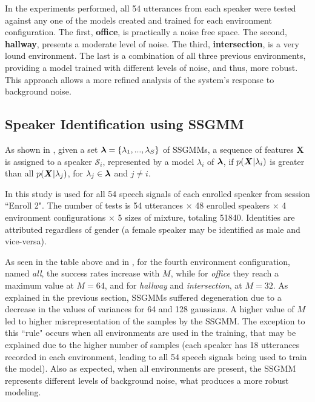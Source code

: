 In the experiments performed, all 54 utterances from each speaker were tested against any one of the models created and trained for each environment configuration. The first, \textbf{office}, is practically a noise free space. The second, \textbf{hallway}, presents a moderate level of noise. The third, \textbf{intersection}, is a very lound environment. The last is a combination of all three previous environments, providing a model trained with different levels of noise, and thus, more robust. This approach allows a more refined analysis of the system's response to background noise.

\subsection{Speaker Identification using SSGMM}

As shown in , given a set $\boldsymbol{\lambda} = \{\lambda_1, ..., \lambda_S\}$ of SSGMMs, a sequence of features $\boldsymbol{X}$ is assigned to a speaker $\mathcal{S}_i$, represented by a model $\lambda_i$ of $\boldsymbol{\lambda}$, if $p(\boldsymbol{X}|\lambda_i)$ is greater than all $p(\boldsymbol{X}|\lambda_j)$, for $\lambda_j \in \boldsymbol{\lambda}$ and $j \ne i$.



In this study  is used for all 54 speech signals of each enrolled speaker from session ``Enroll 2". The number of tests is 54 utterances $\times$ 48 enrolled speakers $\times$ 4 environment configurations $\times$ 5 sizes of mixture, totaling 51840. Identities are attributed regardless of gender (a female speaker may be identified as male and vice-versa).

As seen in the table above and in , for the fourth environment configuration, named \emph{all}, the success rates increase with $M$, while for \emph{office} they reach a maximum value at $M = 64$, and for \emph{hallway} and \emph{intersection}, at $M = 32$. As explained in the previous section, SSGMMs suffered degeneration due to a decrease in the values of variances for 64 and 128 gaussians. A higher value of $M$ led to higher misrepresentation of the samples by the SSGMM. The exception to this ``rule" occurs when all environments are used in the training, that may be explained due to the higher number of samples (each speaker has 18 utterances recorded in each environment, leading to all 54 speech signals being used to train the model). Also as expected, when all environments are present, the SSGMM represents different levels of background noise, what produces a more robust modeling.

